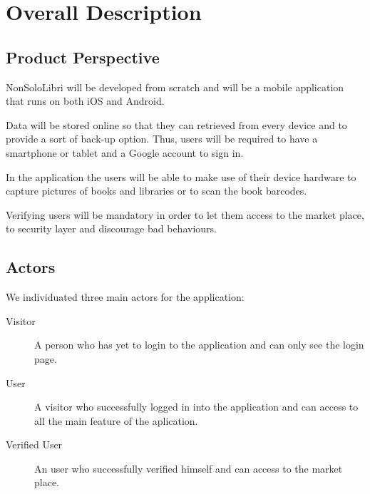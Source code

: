 \chapter{Overall Description}

\section{Product Perspective}
NonSoloLibri will be developed from scratch and will be a mobile application that runs on
both iOS and Android. 

Data will be stored online so that they can retrieved from every device and to provide a sort of back-up option.
Thus, users will be required to have a smartphone or tablet and a Google account to sign in.

In the application the users will be able to make use of their device hardware to capture pictures of books and libraries or to scan the book barcodes.

Verifying users will be mandatory in order to let them access to the market place, to security layer and discourage bad behaviours.

\section{Actors}

We individuated three main actors for the application:

\begin{description}
    \item[Visitor] A person who has yet to login to the application and can only see the login page.
    \item[User] A visitor who successfully logged in into the application and can access to all the main feature of the aplication.
    \item[Verified User] An user who successfully verified himself and can access to the market place.
\end{description} 

\newpage

